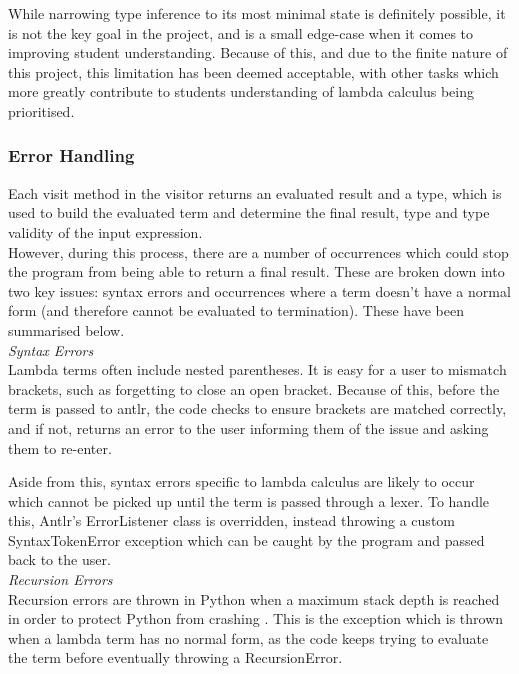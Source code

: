 \documentclass[a4paper,12pt]{report}
\begin{document}
While narrowing type inference to its most minimal state is definitely possible, it is not the key goal in the project, and is a small edge-case when it comes to improving student understanding. Because of this, and due to the finite nature of this project, this limitation has been deemed acceptable, with other tasks which more greatly contribute to students understanding of lambda calculus being prioritised.

\subsubsection{Error Handling}
Each visit method in the visitor returns an evaluated result and a type, which is used to build the evaluated term and determine the final result, type and type validity of the input expression.\\

However, during this process, there are a number of occurrences which could stop the program from being able to return a final result. These are broken down into two key issues: syntax errors and occurrences where a term doesn't have a normal form (and therefore cannot be evaluated to termination). These have been summarised below.\\

\textit{Syntax Errors}\\
Lambda terms often include nested parentheses. It is easy for a user to mismatch brackets, such as forgetting to close an open bracket. Because of this, before the term is passed to antlr, the code checks to ensure brackets are matched correctly, and if not, returns an error to the user informing them of the issue and asking them to re-enter.

Aside from this, syntax errors specific to lambda calculus are likely to occur which cannot be picked up until the term is passed through a lexer. To handle this, Antlr's ErrorListener class is overridden, instead throwing a custom SyntaxTokenError exception which can be caught by the program and passed back to the user.\\

\textit{Recursion Errors}\\
Recursion errors are thrown in Python when a maximum stack depth is reached in order to protect Python from crashing \cite{PythonStack2019}. This is the exception which is thrown when a lambda term has no normal form, as the code keeps trying to evaluate the term before eventually throwing a RecursionError.
\end{document}

